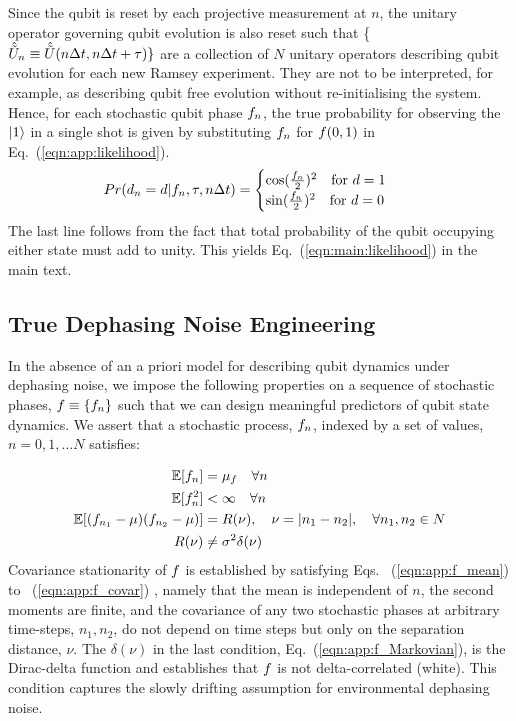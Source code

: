 Since the qubit is reset by each projective measurement at $n$, the unitary operator governing qubit evolution is also reset such that \{$\hat{\tilde{U}}_n \equiv \hat{\tilde{U}}(n\Delta t, n\Delta t + \tau) \}$ are a collection of $N$ unitary operators describing qubit evolution for each new Ramsey experiment. They are not to be interpreted, for example, as describing qubit free evolution without re-initialising the system. Hence, for each stochastic qubit phase $f_n$, the true probability for observing the $| 1 \rangle$ in a single shot is given by substituting $f_n $ for $ f(0,1)$ in Eq.~(\ref {eqn:app:likelihood}).
\begin{align}
Pr(d_n=d | f_n, \tau, n \Delta t) &= \begin{cases} \cos(\frac{f_{n}}{2})^2 \quad \text{for $d=1$} \\   \sin(\frac{f_{n}}{2})^2  \quad \text{for $ d=0$} \end{cases} 
\end{align}
The last line follows from the fact that total probability of the qubit occupying either state must add to unity. This yields Eq.~(\ref {eqn:main:likelihood}) in the main text.


\subsection{True Dephasing Noise Engineering \label{sec:app:truenoise}} 
In the absence of an a priori model for describing qubit dynamics under dephasing noise, we impose the following properties on a sequence of stochastic phases, $f  \equiv \{ f_n \}$ such that we can design meaningful predictors of qubit state dynamics. We assert that a stochastic process, $f_n$, indexed by a set of values, $ n = 0, 1, \hdots N $ satisfies: 

\begin{align}
\mathbb{E}[f_n] &= \mu_f \quad \forall n \label{eqn:app:f_mean} \\
\mathbb{E}[f_n^2] & < \infty \quad \forall n \label{eqn:app:f_var} \\
\mathbb{E}[(f_{n_1} - \mu)(f_{n_2} - \mu)] &= R(\nu), \quad  \nu = |n_1-n_2|, \quad \forall n_1, n_2 \in N  \label{eqn:app:f_covar} \\
R(\nu) & \neq \sigma^2  \delta(\nu) \label{eqn:app:f_Markovian} 
\end{align}
Covariance stationarity of $f$ is established by satisfying Eqs. ~(\ref {eqn:app:f_mean}) to ~(\ref {eqn:app:f_covar}) , namely that the mean is independent of $n$, the second moments are finite, and the covariance of any two stochastic phases at arbitrary time-steps, $n_1, n_2$, do not depend on time steps but only on the separation distance, $\nu$. The $\delta(\nu)$ in the last condition,   Eq.~(\ref {eqn:app:f_Markovian}), is the Dirac-delta function and establishes that $f$ is not delta-correlated (white). This condition captures the slowly drifting assumption for environmental dephasing noise. 


